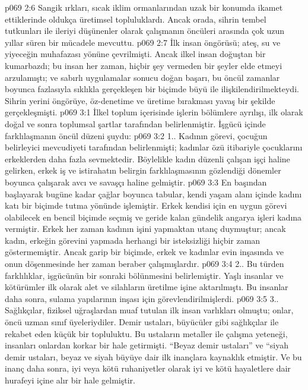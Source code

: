 \vs p069 2:6 Sangik ırkları, sıcak iklim ormanlarından uzak bir konumda ikamet ettiklerinde oldukça üretimsel topluluklardı. Ancak orada, sihrin tembel tutkunları ile ileriyi düşünenler olarak çalışmanın öncüleri arasında çok uzun yıllar süren bir mücadele mevcuttu.
\vs p069 2:7 İlk insan öngörüsü; ateş, su ve yiyeceğin muhafazası yönüne çevrilmişti. Ancak ilkel insan doğuştan bir kumarbazdı; bu insan her zaman, hiçbir şey vermeden bir şeyler elde etmeyi arzulamıştı; ve sabırlı uygulamalar sonucu doğan başarı, bu öncül zamanlar boyunca fazlasıyla sıklıkla gerçekleşen bir biçimde büyü ile ilişkilendirilmekteydi. Sihrin yerini öngörüye, öz\hyp{}denetime ve üretime bırakması yavaş bir şekilde gerçekleşmişti.
\vs p069 3:1 İlkel toplum içerisinde işlerin bölümlere ayrılışı, ilk olarak doğal ve sonra toplumsal şartlar tarafından belirlenmiştir. İşgücü içinde farklılaşmanın öncül düzeni şuydu:
\vs p069 3:2 1.. Kadının görevi, çocuğun belirleyici mevcudiyeti tarafından belirlenmişti; kadınlar özü itibariyle çocuklarını erkeklerden daha fazla sevmektedir. Böylelikle kadın düzenli çalışan işçi haline gelirken, erkek iş ve istirahatın belirgin farklılaşmasının gözlendiği dönemler boyunca çalışarak avcı ve savaşçı haline gelmiştir.
\vs p069 3:3 En başından başlayarak bugüne kadar çağlar boyunca tabular, kendi yaşam alanı içinde kadını katı bir biçimde tutma yönünde işlemiştir. Erkek kendisi için en uygun görevi olabilecek en bencil biçimde seçmiş ve geride kalan gündelik angarya işleri kadına vermiştir. Erkek her zaman kadının işini yapmaktan utanç duymuştur; ancak kadın, erkeğin görevini yapmada herhangi bir isteksizliği hiçbir zaman göstermemiştir. Ancak garip bir biçimde, erkek ve kadınlar evin inşasında ve onun döşenmesinde her zaman beraber çalışmışlardır.
\vs p069 3:4 2.\bibnobreakspace {}. Bu türden farklılıklar, işgücünün bir sonraki bölünmesini belirlemiştir. Yaşlı insanlar ve kötürümler ilk olarak alet ve silahların üretilme işine aktarılmıştı. Bu insanlar daha sonra, sulama yapılarının inşası için görevlendirilmişlerdi.
\vs p069 3:5 3.\bibnobreakspace {}. Sağlıkçılar, fiziksel uğraşlardan muaf tutulan ilk insan varlıkları olmuştu; onlar, öncü uzman sınıf üyeleriydiler. Demir ustaları, büyücüler gibi sağlıkçılar ile rekabet eden küçük bir topluluktu. Bu ustaların metaller ile çalışma yeteneği, insanları onlardan korkar bir hale getirmişti. “Beyaz demir ustaları” ve “siyah demir ustaları, beyaz ve siyah büyüye dair ilk inançlara kaynaklık etmiştir. Ve bu inanç daha sonra, iyi veya kötü ruhaniyetler olarak iyi ve kötü hayaletlere dair hurafeyi içine alır bir hale gelmiştir.
